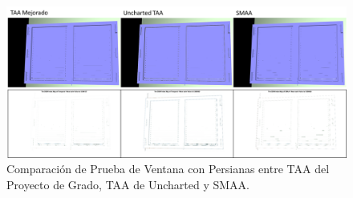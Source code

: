 \documentclass[pregrado]{tesis-usb} %
\begin{document}
\begin{figure}[!htb]
	\centering
	\includegraphics[scale=0.3]{images/results/window_blind.png}
	\caption{Comparación de Prueba de Ventana con Persianas entre TAA del Proyecto de Grado, TAA de Uncharted y SMAA.}\label{fig:window_blind_render}
\end{figure}

\FloatBarrier
\end{document}
